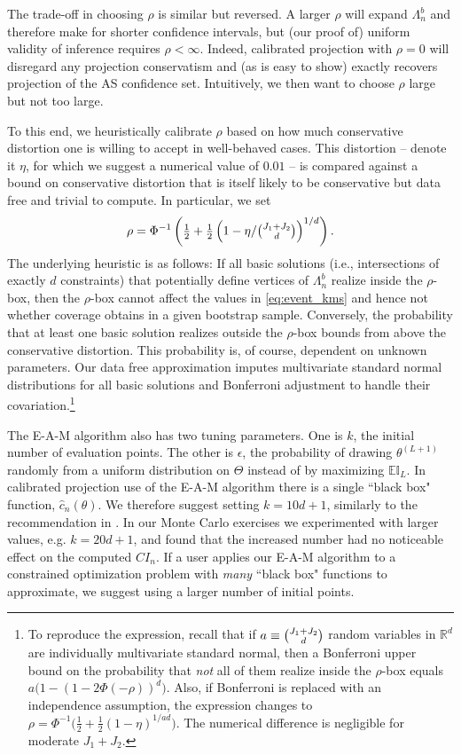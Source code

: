 \documentclass[letterpaper,11pt]{article}
\theoremstyle{myplain}
\theoremstyle{mydefinition}
\theoremstyle{myremark}
\renewcommand{\cite}{\citet}
\numberwithin{equation}{section}
\numberwithin{figure}{section}
\begin{document}
The trade-off in choosing $\rho$ is similar but reversed. A larger $\rho$ will expand $\Lambda_n^b$ and therefore make for shorter confidence intervals, but (our proof of) uniform validity of inference requires $\rho<\infty$. Indeed, calibrated projection with $\rho=0$ will disregard any projection conservatism and (as is easy to show) exactly recovers projection of the AS confidence set. Intuitively, we then want to choose $\rho$ large but not too large.

To this end, we heuristically calibrate $\rho$ based on how much conservative distortion one is willing to accept in well-behaved cases. This distortion -- denote it $\eta$, for which we suggest a numerical value of $0.01$ -- is compared against a bound on conservative distortion that is itself likely to be conservative but data free and trivial to compute. In particular, we set
\begin{align}
\label{eq:beta_rho}\small
\rho=\Phi^{-1}\left(\tfrac{1}{2}+\tfrac{1}{2}\left(1-\eta/\tbinom{J_1+J_2}{d}\right)^{1/d}\right).
\end{align}
The underlying heuristic is as follows: If all basic solutions (i.e., intersections of exactly $d$ constraints) that potentially define vertices of $\Lambda^b_n$ realize inside the $\rho$-box, then the $\rho$-box cannot affect the values in \eqref{eq:event_kms} and hence not whether coverage obtains in a given bootstrap sample. Conversely, the probability that at least one basic solution realizes outside the $\rho$-box bounds from above the conservative distortion. This probability is, of course, dependent on unknown parameters. Our data free approximation imputes multivariate standard normal distributions for all basic solutions and Bonferroni adjustment to handle their covariation.\footnote{To reproduce the expression, recall that if $a\equiv\tbinom{J_1+J_2}{d}$ random variables in $\mathbb{R}^d$ are individually multivariate standard normal, then a Bonferroni upper bound on the probability that \textit{not} all of them realize inside the $\rho$-box equals
$a\bigl(1-\left(1-2\Phi(-\rho)\right)^d\bigr).$ Also, if Bonferroni is replaced with an independence assumption, the expression changes to $\rho=\Phi^{-1}\bigl(\tfrac{1}{2}+\tfrac{1}{2}(1-\eta)^{1/ad}\bigr)$. The numerical difference is negligible for moderate $J_1+J_2$.}

The E-A-M algorithm also has two tuning parameters.
One is $k$, the initial number of evaluation points.
The other is $\epsilon$, the probability of drawing $\theta^{(L+1)}$ randomly from a uniform distribution on $\Theta$ instead of by maximizing $\mathbb{EI}_L$.
In calibrated projection use of the E-A-M algorithm there is a single ``black box" function, $\hat{c}_n(\theta)$. We therefore suggest setting $k=10d+1$, similarly to the recommendation in \cite[p. 473]{jonesefficient1998}. In our Monte Carlo exercises we experimented with larger values, e.g. $k=20d+1$, and found that the increased number had no noticeable effect on the computed $CI_n$.
If a user applies our E-A-M algorithm to a constrained optimization problem with \emph{many} ``black box" functions to approximate, we suggest using a larger number of initial points.
\end{document}
